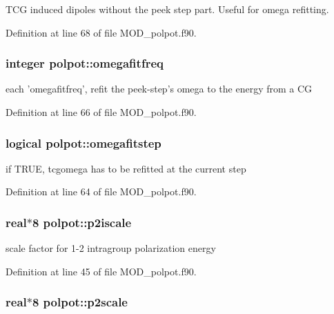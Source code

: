 T\-C\-G induced dipoles without the peek step part. Useful for omega refitting. 



Definition at line 68 of file M\-O\-D\-\_\-polpot.\-f90.

\hypertarget{classpolpot_a4aaa630ebb2190fb76d5dca094d15472}{
\subsubsection[{omegafitfreq}]{\setlength{\rightskip}{0pt plus 5cm}integer polpot\-::omegafitfreq}}\label{classpolpot_a4aaa630ebb2190fb76d5dca094d15472}


each 'omegafitfreq', refit the peek-\/step's omega to the energy from a C\-G 



Definition at line 66 of file M\-O\-D\-\_\-polpot.\-f90.

\hypertarget{classpolpot_ae78e1a279ab2c444684065b7ee886d27}{
\subsubsection[{omegafitstep}]{\setlength{\rightskip}{0pt plus 5cm}logical polpot\-::omegafitstep}}\label{classpolpot_ae78e1a279ab2c444684065b7ee886d27}


if T\-R\-U\-E, tcgomega has to be refitted at the current step 



Definition at line 64 of file M\-O\-D\-\_\-polpot.\-f90.

\hypertarget{classpolpot_a2ee10885cf2d88a471e57d26820ea244}{
\subsubsection[{p2iscale}]{\setlength{\rightskip}{0pt plus 5cm}real$\ast$8 polpot\-::p2iscale}}\label{classpolpot_a2ee10885cf2d88a471e57d26820ea244}


scale factor for 1-\/2 intragroup polarization energy 



Definition at line 45 of file M\-O\-D\-\_\-polpot.\-f90.

\hypertarget{classpolpot_aa8be13777bcaf7e8588e213a1314b4b1}{
\subsubsection[{p2scale}]{\setlength{\rightskip}{0pt plus 5cm}real$\ast$8 polpot\-::p2scale}}\label{classpolpot_aa8be13777bcaf7e8588e213a1314b4b1}


